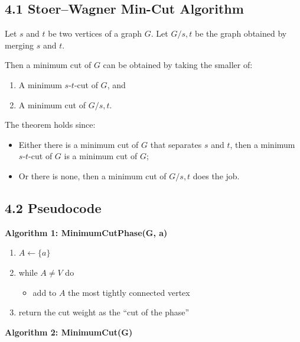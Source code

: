 \documentclass[12pt]{article}
\begin{document}
\subsection*{4.1 Stoer–Wagner Min-Cut Algorithm}

Let \( s \) and \( t \) be two vertices of a graph \( G \). Let \( G/{s,t} \) be the graph obtained by merging \( s \) and \( t \).

Then a minimum cut of \( G \) can be obtained by taking the smaller of:

\begin{enumerate}
    \item A minimum \( s\text{-}t \)-cut of \( G \), and
    \item A minimum cut of \( G/{s,t} \).
\end{enumerate}

The theorem holds since:

\begin{itemize}
    \item Either there is a minimum cut of \( G \) that separates \( s \) and \( t \), then a minimum \( s\text{-}t \)-cut of \( G \) is a minimum cut of \( G \);
    \item Or there is none, then a minimum cut of \( G/{s,t} \) does the job.
\end{itemize}

\subsection*{4.2 Pseudocode}

\textbf{Algorithm 1: MinimumCutPhase(G, a)}

\begin{enumerate}
    \item \( A \leftarrow \{a\} \)
    \item while \( A \neq V \) do
    \begin{itemize}
        \item add to \( A \) the most tightly connected vertex
    \end{itemize}
    \item return the cut weight as the “cut of the phase”
\end{enumerate}

\textbf{Algorithm 2: MinimumCut(G)}
\end{document}

